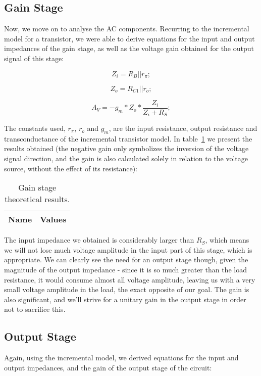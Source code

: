 \subsection{Gain Stage}
Now, we move on to analyse the AC components. Recurring to the incremental model for a transistor, we were able to derive equations for the input and output impedances of the gain stage, as well as the voltage gain obtained for the output signal of this stage:

\begin{equation}
  Z_i=R_B||r_{\pi};
\end{equation}

\begin{equation}
  Z_o=R_{C1}||r_o;
\end{equation}

\begin{equation}
  A_V = -g_{m}*Z_{o}*\frac{Z_i}{Z_{i}+R_{S}};
\end{equation}

The constants used, $r_{\pi}$, $r_o$ and $g_m$, are the input resistance, output resistance and transconductance of the incremental transistor model. In table~\ref{tab:gain} we present the results obtained (the negative gain only symbolizes the inversion of the voltage signal direction, and the gain is also calculated solely in relation to the voltage source, without the effect of its resistance):

\begin{table}[h]
  \centering
  \begin{tabular}{|l|r|}
    \hline    
    {\bf Name} & {\bf Values} \\ \hline
     
  \end{tabular}
  \caption{Gain stage theoretical results.}
  \label{tab:gain}
\end{table}

The input impedance we obtained is considerably larger than $R_S$, which means we will not lose much voltage amplitude in the input part of this stage, which is appropriate. We can clearly see the need for an output stage though, given the magnitude of the output impedance - since it is so much greater than the load resistance, it would consume almost all voltage amplitude, leaving us with a very small voltage amplitude in the load, the exact opposite of our goal. The gain is also significant, and we'll strive for a unitary gain in the output stage in order not to sacrifice this.

\subsection{Output Stage}
Again, using the incremental model, we derived equations for the input and output impedances, and the gain of the output stage of the circuit:

